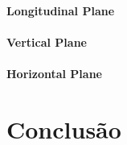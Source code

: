\documentclass[
	12pt,				%
	openright,			%
	oneside,			%
	a4paper,		%
	chapter=TITLE,		%
	section=TITLE,		%
    brazil,				%
	english,			%
	sumario=tradicional,
	]{abntex2}
\begin{document}
      \subsubsection{Longitudinal Plane}
      \subsubsection{Vertical Plane}
      \subsubsection{Horizontal Plane}



	\chapter*[Conclusão]{Conclusão}
	\lipsum[1-5]


	\postextual
	
\end{document}
